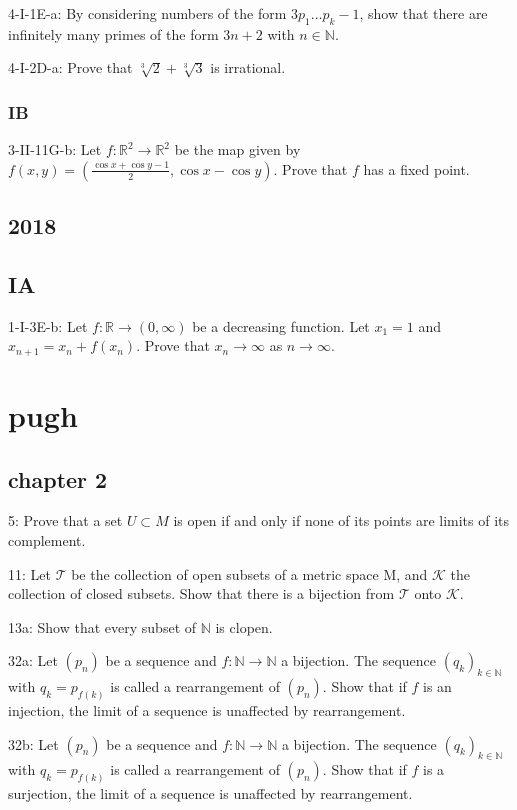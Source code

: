 \documentclass{article}
\begin{document}
4-I-1E-a: By considering numbers of the form $3 p_{1} \ldots p_{k}-1$, show that there are infinitely many primes of the form $3 n+2$ with $n \in \mathbb{N}$.

4-I-2D-a: Prove that $\sqrt[3]{2}+\sqrt[3]{3}$ is irrational.

\subsubsection*{IB}
3-II-11G-b: Let $f: \mathbb{R}^{2} \rightarrow \mathbb{R}^{2}$ be the map given by
$f(x, y)=\left(\frac{\cos x+\cos y-1}{2}, \cos x-\cos y\right) .$ Prove that $f$ has a fixed point. 

\subsection*{2018}
\subsection*{IA}
1-I-3E-b: Let $f: \mathbb{R} \rightarrow(0, \infty)$ be a decreasing function. Let $x_{1}=1$ and $x_{n+1}=x_{n}+f\left(x_{n}\right)$. Prove that $x_{n} \rightarrow \infty$ as $n \rightarrow \infty$.

\section{pugh}
\subsection*{chapter 2}
5: Prove that a set $U \subset M$ is open if and only if none of its points are limits of its complement.

11: Let $\mathcal{T}$ be the collection of open subsets of a metric space $\mathrm{M}$, and $\mathcal{K}$ the collection of closed subsets. Show that there is a bijection from $\mathcal{T}$ onto $\mathcal{K}$.

13a: Show that every subset of $\mathbb{N}$ is clopen. 

32a: Let $(p_n)$ be a sequence and $f:\mathbb{N}\to\mathbb{N}$ a bijection. The sequence $(q_k)_{k\in\mathbb{N}}$ with $q_k=p_{f(k)}$ is called a rearrangement of $(p_n)$. Show that if $f$ is an injection, the limit of a sequence is unaffected by rearrangement. 

32b: Let $(p_n)$ be a sequence and $f:\mathbb{N}\to\mathbb{N}$ a bijection. The sequence $(q_k)_{k\in\mathbb{N}}$ with $q_k=p_{f(k)}$ is called a rearrangement of $(p_n)$. Show that if $f$ is a surjection, the limit of a sequence is unaffected by rearrangement. 
\end{document}
